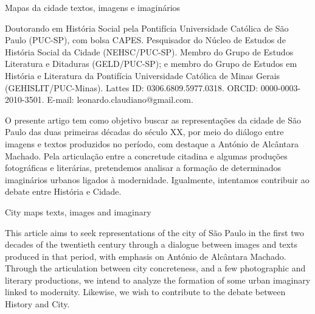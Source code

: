 \begin{refsection}
    \renewcommand{\thefigure}{\arabic{figure}}

    \chapterTwoLines
    {Mapas da cidade}
    {textos, imagens e imaginários}
    \label{chap:mapadacidade}
    
    {Doutorando em História Social pela Pontifícia Universidade Católica de São
    Paulo (PUC-SP), com bolsa CAPES. Pesquisador do Núcleo de Estudos de
    História Social da Cidade (NEHSC/PUC-SP). Membro do Grupo de Estudos
    Literatura e Ditaduras (GELD/PUC-SP); e membro do Grupo de Estudos em
    História e Literatura da Pontifícia Universidade Católica de Minas Gerais
    (GEHISLIT/PUC-Minas). Lattes ID: 0306.6809.5977.0318. ORCID:
    0000-0003-2010-3501. E-mail: leonardo.claudiano@gmail.com.}

    \begin{galoResumo}
         O presente artigo tem como objetivo buscar as representações da
        cidade de São Paulo das duas primeiras décadas do século XX, por meio
        do diálogo entre imagens e textos produzidos no período, com destaque a
        António de Alcântara Machado. Pela articulação entre a concretude
        citadina e algumas produções fotográficas e literárias, pretendemos
        analisar a formação de determinados imaginários urbanos ligados à
        modernidade. Igualmente, intentamos contribuir ao debate entre História
        e Cidade.
    \end{galoResumo}
    
    
    \begin{otherlanguage}{english}
    
    \fakeChapterTwoLines
    {City maps}
    {texts, images and imaginary}

    \begin{galoResumo}[Abstract]
        This article aims to seek representations of the city of São Paulo in
        the first two decades of the twentieth century through a dialogue
        between images and texts produced in that period, with emphasis on
        António de Alcântara Machado. Through the articulation between city
        concreteness, and a few photographic and literary productions, we intend
        to analyze the formation of some urban imaginary linked to
        modernity. Likewise, we wish to contribute to the debate between
        History and City.
    \end{galoResumo}
    

\end{otherlanguage}
\end{refsection}
